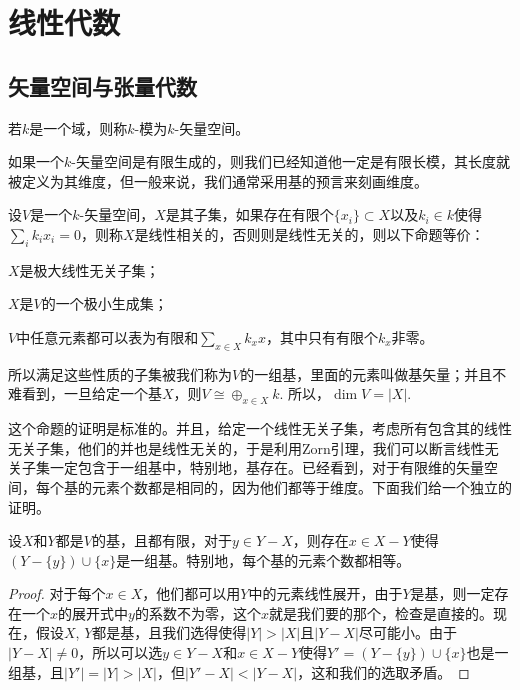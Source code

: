 \chapter{线性代数}
\section{矢量空间与张量代数}

\begin{para}[矢量空间]
   若$k$是一个域，则称$k$-模为$k$-矢量空间。
\end{para}

如果一个$k$-矢量空间是有限生成的，则我们已经知道他一定是有限长模，其长度就被定义为其维度，但一般来说，我们通常采用基的预言来刻画维度。

\begin{pro}
    设$V$是一个$k$-矢量空间，$X$是其子集，如果存在有限个$\{x_i\}\subset X$以及$k_i\in k$使得$\sum_i k_ix_i=0$，则称$X$是线性相关的，否则则是线性无关的，则以下命题等价：
    \begin{compactenum}
        \item $X$是极大线性无关子集；
        \item $X$是$V$的一个极小生成集；
        \item $V$中任意元素都可以表为有限和$\sum_{x\in X}k_x x$，其中只有有限个$k_x$非零。
    \end{compactenum}
    所以满足这些性质的子集被我们称为$V$的一组基，里面的元素叫做基矢量；并且不难看到，一旦给定一个基$X$，则$V\cong \oplus_{x\in X}k$. 所以，$\dim V=|X|$.
\end{pro}

这个命题的证明是标准的。并且，给定一个线性无关子集，考虑所有包含其的线性无关子集，他们的并也是线性无关的，于是利用Zorn引理，我们可以断言线性无关子集一定包含于一组基中，特别地，基存在。已经看到，对于有限维的矢量空间，每个基的元素个数都是相同的，因为他们都等于维度。下面我们给一个独立的证明。

\begin{pro}
设$X$和$Y$都是$V$的基，且都有限，对于$y\in Y-X$，则存在$x\in X-Y$使得$(Y-\{y\})\cup \{x\}$是一组基。特别地，每个基的元素个数都相等。
\end{pro}

\begin{proof}
对于每个$x\in X$，他们都可以用$Y$中的元素线性展开，由于$Y$是基，则一定存在一个$x$的展开式中$y$的系数不为零，这个$x$就是我们要的那个，检查是直接的。现在，假设$X$, $Y$都是基，且我们选得使得$|Y|>|X|$且$|Y-X|$尽可能小。由于$|Y-X|\neq 0$，所以可以选$y\in Y-X$和$x\in X-Y$使得$Y'=(Y-\{y\})\cup \{x\}$也是一组基，且$|Y'|=|Y|>|X|$，但$|Y'-X|<|Y-X|$，这和我们的选取矛盾。
\end{proof}

